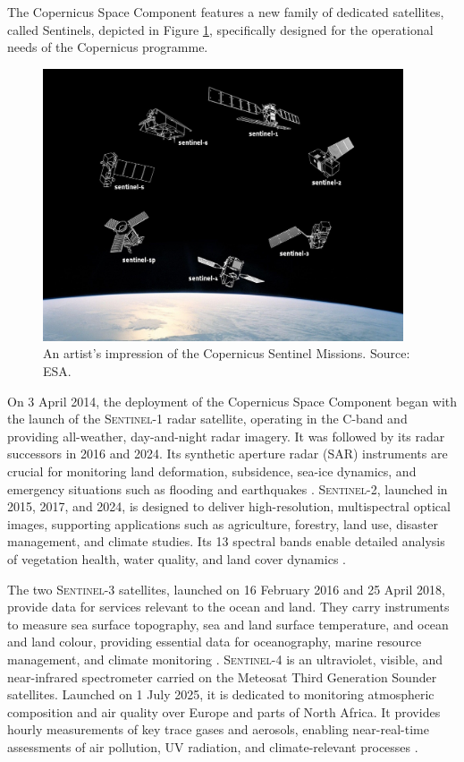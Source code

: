 The Copernicus Space Component features a new family of dedicated satellites,
called Sentinels, depicted in Figure \ref{fig:sentinels}, specifically designed for the operational needs of the Copernicus programme. 
\begin{figure}[!htbp]
  \centering
  \includegraphics[width=0.95\textwidth]{img/sentinels.png}
  \caption[Copernicus Sentinel missions (artist’s impression)]{An artist's impression of the Copernicus Sentinel Missions. Source: ESA.}
  \label{fig:sentinels}
\end{figure}
On 3 April 2014, the deployment of the Copernicus Space Component began with the
launch of the \textsc{Sentinel-1} radar satellite, operating in the C-band and providing all-weather, day-and-night radar imagery. It was followed by its radar successors in 2016 and 2024. Its synthetic aperture radar (SAR) instruments are crucial for monitoring land deformation, subsidence, sea-ice dynamics, and emergency situations such as flooding and earthquakes \cite{ESA_Copernicus,ESA_SentinelMissions}.
\textsc{Sentinel-2}, launched in 2015, 2017, and 2024, is designed to deliver high-resolution, multispectral optical images, supporting applications such as agriculture, forestry, land use, disaster management, and climate studies. Its 13 spectral bands enable detailed analysis of vegetation health, water quality, and land cover dynamics \cite{ESA_Copernicus}.

The two \textsc{Sentinel-3} satellites, launched on 16 February 2016 and 25 April 2018, provide data for services relevant to the ocean and land. They carry instruments to measure sea surface topography, sea and land surface temperature, and ocean and land colour, providing essential data for oceanography, marine resource management, and climate monitoring \cite{ESA_SentinelMissions,ESA_Copernicus}.
\textsc{Sentinel-4} is an ultraviolet, visible, and near-infrared spectrometer carried on the Meteosat Third Generation Sounder satellites. Launched on 1 July 2025, it is dedicated to monitoring atmospheric composition and air quality over Europe and parts of North Africa. It provides hourly measurements of key trace gases and aerosols, enabling near-real-time assessments of air pollution, UV radiation, and climate-relevant processes \cite{ESA_Copernicus}.

